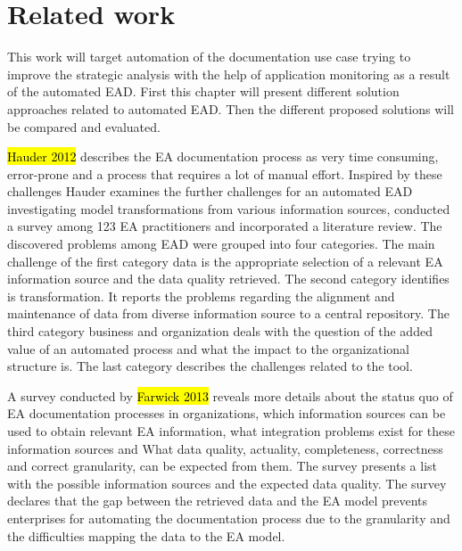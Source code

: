\chapter{Related work}\label{chapter:related work}

This work will target automation of the documentation use case trying to improve the strategic analysis with the help of application monitoring as a result of the automated EAD. First this chapter will present different solution approaches related to automated EAD. Then the different proposed solutions will be compared and evaluated. 

\hl{Hauder 2012} describes the EA documentation process as very time consuming, error-prone and a process that requires a lot of manual effort. Inspired by these challenges Hauder examines the further challenges for an automated EAD investigating model transformations from various information sources, conducted a survey among 123 EA practitioners and incorporated a literature review. The discovered problems among EAD were grouped into four categories. The main challenge of the first category data is the appropriate selection of a relevant EA information source and the data quality retrieved. The second category identifies is transformation. It reports the problems regarding the alignment and maintenance of data from diverse information source to a central repository. The third category business and organization deals with the question of the added value of an automated process and what the impact to the organizational structure is. The last category describes the challenges related to the tool. 

A survey conducted by \hl{Farwick 2013} reveals more details about the  status quo of EA documentation processes in organizations, which information sources can be used to obtain relevant EA information, what integration problems exist for these information sources and What data quality, actuality, completeness, correctness and correct granularity, can be expected from them. The survey presents a list with the possible information sources and the expected data quality. The survey declares that the gap between the retrieved data and the EA model prevents enterprises for automating the documentation process due to the granularity and the difficulties mapping the data to the EA model.

